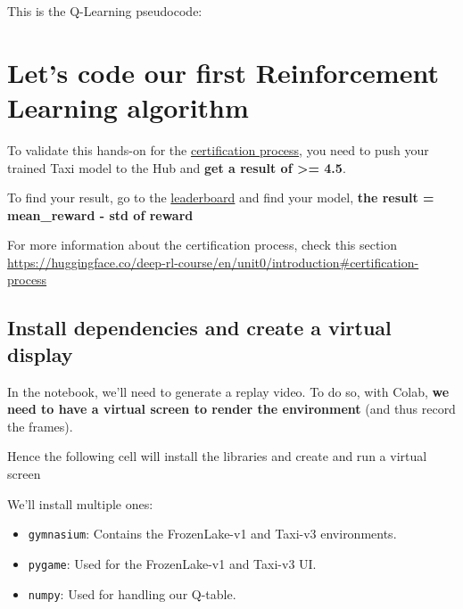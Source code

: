 \documentclass[11pt,a4paper]{article}
\begin{document}

This is the Q-Learning pseudocode:


\section{Let's code our first Reinforcement Learning algorithm}\label{lets-code-our-first-reinforcement-learning-algorithm}

To validate this hands-on for the \href{https://huggingface.co/deep-rl-course/en/unit0/introduction\#certification-process}{certification process}, you need to push your trained Taxi model to the Hub and \textbf{get a result of \textgreater= 4.5}.

To find your result, go to the \href{https://huggingface.co/spaces/huggingface-projects/Deep-Reinforcement-Learning-Leaderboard}{leaderboard} and find your model, \textbf{the result = mean\_reward - std of reward}

For more information about the certification process, check this section \url{https://huggingface.co/deep-rl-course/en/unit0/introduction\#certification-process}

\subsection{Install dependencies and create a virtual display}\label{install-dependencies-and-create-a-virtual-display}

In the notebook, we'll need to generate a replay video. To do so, with Colab, \textbf{we need to have a virtual screen to render the environment} (and thus record the frames).

Hence the following cell will install the libraries and create and run a virtual screen

We'll install multiple ones:

\begin{itemize}
\tightlist
\item
  \passthrough{\lstinline!gymnasium!}: Contains the FrozenLake-v1 and Taxi-v3 environments.
\item
  \passthrough{\lstinline!pygame!}: Used for the FrozenLake-v1 and Taxi-v3 UI.
\item
  \passthrough{\lstinline!numpy!}: Used for handling our Q-table.
\end{itemize}
\end{document}
